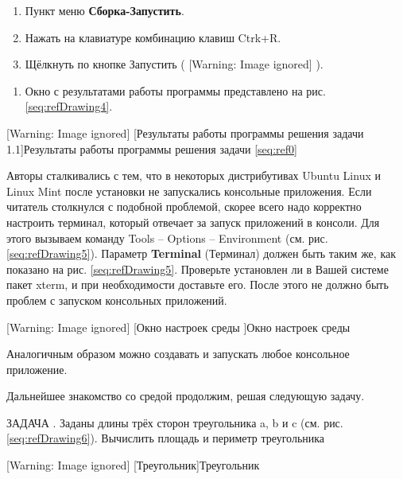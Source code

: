 \begin{enumerate}
\item Пункт меню \textbf{Сборка-Запустить}.
\item Нажать на клавиатуре комбинацию клавиш Ctrk+R.
\item Щёлкнуть по кнопке Запустить (  [Warning: Image ignored] %
 ).
\end{enumerate}
\begin{enumerate}
\item[] Окно с результатами работы программы представлено на рис. \ref{seq:refDrawing4}.
\end{enumerate}
 [Warning: Image ignored] %
[Результаты работы программы решения задачи 1.1]{Результаты работы программы решения задачи
\ref{seq:ref0}}
\label{seq:refDrawing4}


Авторы сталкивались с тем, что в некоторых дистрибутивах Ubuntu Linux и Linux Mint после установки  не
запускались консольные приложения. Если читатель столкнулся с подобной проблемой, скорее всего надо корректно настроить
терминал, который отвечает за запуск приложений в консоли. Для этого вызываем команду Tools – Options – Environment
(см. рис. \ref{seq:refDrawing5}). Параметр \textbf{Terminal} (Терминал) должен быть таким же, как показано на рис.
\ref{seq:refDrawing5}. Проверьте установлен ли в Вашей системе пакет xterm, и при необходимости доставьте его. После
этого не должно быть проблем с запуском консольных приложений.

 [Warning: Image ignored] %
[Окно настроек среды ]{Окно настроек среды }
\label{seq:refDrawing5}


Аналогичным образом можно создавать и запускать любое консольное приложение.

Дальнейшее знакомство со средой  продолжим, решая следующую задачу.

ЗАДАЧА . Заданы длины трёх сторон треугольника a, b и c (см. рис.
\ref{seq:refDrawing6}). Вычислить площадь и периметр треугольника

 [Warning: Image ignored] %
[Треугольник]{Треугольник}
\label{seq:refDrawing6}


